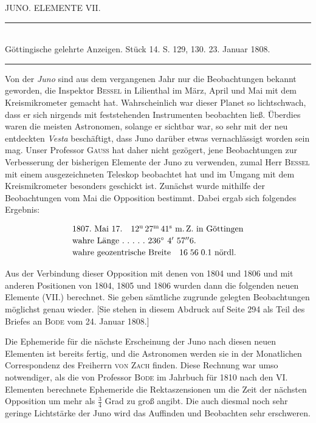 \centerline{JUNO. ELEMENTE VII.}

\begin{center}
\rule{0.5\linewidth}{0.4pt}\\[2pt]
Göttingische gelehrte Anzeigen. Stück 14. S. 129, 130. 23. Januar 1808.\\[2pt]
\rule{0.5\linewidth}{0.4pt}
\end{center}

\par\indent Von der \emph{Juno} sind aus dem vergangenen Jahr nur die Beobachtungen bekannt geworden, die Inspektor \textsc{Bessel} in Lilienthal im März, April und Mai mit dem Kreismikrometer gemacht hat. Wahrscheinlich war dieser Planet so lichtschwach, dass er sich nirgends mit feststehenden Instrumenten beobachten ließ. Überdies waren die meisten Astronomen, solange er sichtbar war, so sehr mit der neu entdeckten \emph{Vesta} beschäftigt, dass Juno darüber etwas vernachlässigt worden sein mag. Unser Professor \textsc{Gauss} hat daher nicht gezögert, jene Beobachtungen zur Verbesserung der bisherigen Elemente der Juno zu verwenden, zumal Herr \textsc{Bessel} mit
einem ausgezeichneten Teleskop beobachtet hat und im Umgang mit dem Kreismikrometer besonders geschickt ist. Zunächst wurde mithilfe der Beobachtungen vom Mai die Opposition bestimmt. Dabei ergab sich folgendes Ergebnis:

\[
\begin{array}{l}
1807.\ \text{Mai}\ 17.\quad 12^{\text{u}}\,27^{\text{m}}\,41^{\text{s}}\ \text{m.\,Z. in Göttingen}\\[2pt]
\text{wahre Länge}\ .\ .\ .\ .\ .\ 236^\circ\ 4'\ 57''6.\\[2pt]
\text{wahre geozentrische Breite}\quad 16\;56\;0.1\ \text{nördl.}
\end{array}
\]\par\indent Aus der Verbindung dieser Opposition mit denen von 1804 und 1806 und mit anderen Positionen von 1804, 1805 und 1806 wurden dann die folgenden neuen Elemente (VII.) berechnet. Sie geben sämtliche zugrunde gelegten Beobachtungen möglichst genau wieder. [Sie stehen in diesem Abdruck auf Seite 294 als Teil des Briefes an \textsc{Bode} vom 24. Januar 1808.]\par\indent Die Ephemeride für die nächste Erscheinung der Juno nach diesen neuen Elementen ist bereits fertig, und die Astronomen werden sie in der Monatlichen Correspondenz des Freiherrn \textsc{von Zach} finden. Diese Rechnung war umso notwendiger, als die von Professor \textsc{Bode} im Jahrbuch für 1810 nach den VI. Elementen berechnete Ephemeride die Rektaszensionen um die Zeit der nächsten Opposition um mehr als $\frac{3}{4}$ Grad zu groß angibt. Die auch diesmal noch sehr geringe Lichtstärke der Juno wird das Auffinden und Beobachten sehr erschweren.
